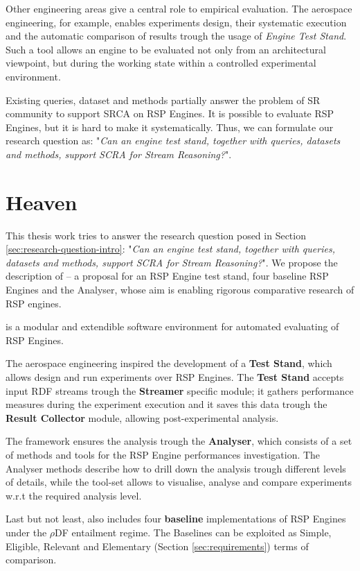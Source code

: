 Other engineering areas give a central role to empirical evaluation. The aerospace engineering, for example, enables experiments design, their systematic execution and the automatic comparison of results trough the usage of \textit{Engine Test Stand}. Such a tool allows an engine to be evaluated not only from an architectural viewpoint, but during the working state within a controlled experimental environment.

Existing queries, dataset and methods partially answer the problem of SR community to support SRCA on RSP Engines. It is possible to evaluate RSP Engines, but it is hard to make it systematically. Thus, we can formulate our research question as: "\textit{Can an engine test stand, together with queries, datasets and methods, support SCRA for Stream Reasoning?}".

\section{Heaven}\label{sec:heaven-intro}

This thesis work tries to answer the research question posed in Section \ref{sec:research-question-intro}: "\textit{Can an engine test stand, together with queries, datasets and methods, support SCRA for Stream Reasoning?}". We propose the description of \name -- a proposal for an RSP Engine test stand, four baseline RSP Engines and the Analyser, whose aim is enabling rigorous comparative research of RSP engines. 

\name is a modular and extendible software environment for automated evaluating of RSP Engines. 

The aerospace engineering inspired the development of a \textbf{Test Stand}, which allows design and run experiments over RSP Engines. The \textbf{Test Stand} accepts input RDF streams trough the \textbf{Streamer} specific module; it gathers performance measures during the experiment execution and it saves this data trough the \textbf{Result Collector} module, allowing post-experimental analysis.

The framework ensures the analysis trough the \textbf{Analyser}, which consists of a set of methods and tools for the RSP Engine performances investigation. The Analyser methods describe how to drill down the analysis trough different levels of details, while the tool-set allows to visualise, analyse and compare experiments w.r.t the required analysis level. 

Last but not least, \name also includes four \textbf{baseline} implementations of RSP Engines under the $\rho$DF \cite{DBLP:conf/esws/MunozPG07} entailment regime. The Baselines can be exploited  as Simple, Eligible, Relevant and Elementary (Section \ref{sec:requirements}) terms of comparison.  

